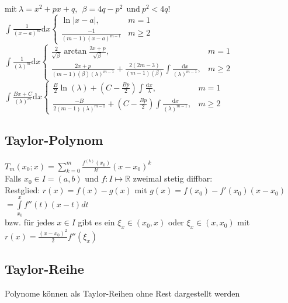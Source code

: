 \documentclass[6pt,a4paper]{scrartcl}
\newcommand{\R}{\ensuremath{\mathbb R}}
\begin{document}
\begin{multicols}{4}
$\text{mit} ~ \lambda=x^2+px+q, ~~ \beta=4q-p^2 ~~ \text{und} ~p^2<4q$!
$\int\frac{1}{(x-a)^m}\mathrm dx \begin{cases} \ln\left|x-a\right|, & m=1\\ \frac{-1}{(m-1)(x-a)^{m-1}} &m\geq2 \end{cases}$\\
$\int\frac{1}{(\lambda)^m} \mathrm dx \begin{cases} \frac{2}{\sqrt{\beta}} \arctan\frac{2x+p}{\sqrt{\beta}}, &m=1\\ \frac{2x+p}{(m-1)(\beta)(\lambda)^{m-1}}+\frac{2(2m-3)}{(m-1)(\beta)} \int\frac{\mathrm dx}{(\lambda)^{m-1}}, &m\geq2 \end{cases}$\\
$\int\frac{Bx+C}{(\lambda)^m} \mathrm dx \begin{cases} \frac{B}{2} \ln(\lambda) + (C-\frac{Bp}{2}) \int\frac{\mathrm dx}{\lambda}, &m=1\\ \frac{-B}{2(m-1)(\lambda)^{m-1}} + (C-\frac{Bp}{2}) \int\frac{\mathrm dx}{(\lambda)^{m-1}}, &m\geq2 \end{cases}$\\

\subsection{Taylor-Polynom}
$T_m(x_0;x)=\sum\limits_{k=0}^m\frac{f^{(k)} (x_0)}{k!} (x-x_0)^k$  \\
Falls $x_0 \in I =(a,b)$ und $ f: I \mapsto \R$ zweimal stetig diffbar: \\
Restglied: $r(x)=f(x)-g(x)$ mit $g(x)=f(x_0)-f'(x_0)(x-x_0)$ \\
$ =\int\limits_{x_0}^x f''(t)(x-t) dt$ \\
bzw. für jedes $x \in I$ gibt es ein $\xi_x \in (x_0,x)$ oder $\xi_x \in (x, x_0)$ mit \\
$r(x)=\frac{(x-x_0)^2}{2}f''(\xi_x)$

\subsection{Taylor-Reihe}
Polynome können als Taylor-Reihen ohne Rest dargestellt werden


\end{multicols}
\end{document}

